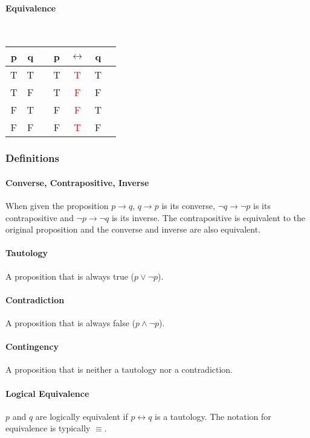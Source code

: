 \documentclass[a4paper, 10pt]{article}
\begin{document}
\begin{multicols}{3}
\paragraph{Equivalence}\mbox{}\\
\begin{tabular}{@{ }c@{ }@{ }c | c@{ }@{ }c@{ }@{ }c@{ }@{ }c@{ }@{ }c}
p & q &  & p & \(\leftrightarrow\) & q & \\
\hline
T & T &  & T & \textcolor{red}{T} & T & \\
T & F &  & T & \textcolor{red}{F} & F & \\
F & T &  & F & \textcolor{red}{F} & T & \\
F & F &  & F & \textcolor{red}{T} & F & \\
\end{tabular}
\end{multicols}
\subsubsection{Definitions}
\paragraph{Converse, Contrapositive, Inverse}
When given the proposition \( p\rightarrow q \), \( q\rightarrow p \) is its converse, \( \neg q\rightarrow \neg p \) is its contrapositive and \( \neg p\rightarrow \neg q \) is its inverse. The contrapositive is equivalent to the original proposition and the converse and inverse are also equivalent.

\paragraph{Tautology}
A proposition that is always true (\(p\lor\neg p\)).

\paragraph{Contradiction}
A proposition that is always false (\(p\land\neg p\)).

\paragraph{Contingency}
A proposition that is neither a tautology nor a contradiction.

\paragraph{Logical Equivalence}
\(p\) and \(q\) are logically equivalent if \(p\leftrightarrow q\) is a tautology. The notation for equivalence is typically \(\equiv\).
\newpage
\end{document}
